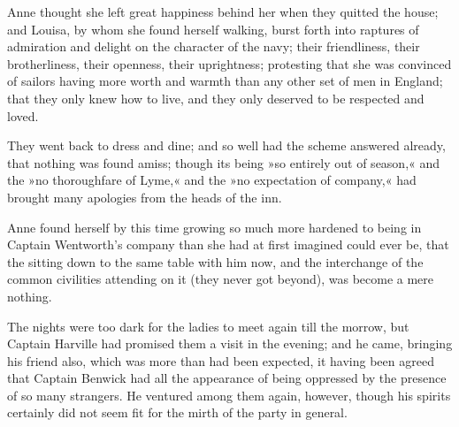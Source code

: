 Anne thought she left great happiness behind her when they quitted the house; and Louisa, by whom she found herself walking, burst forth into raptures of admiration and delight on the character of the navy; their friendliness, their brotherliness, their openness, their uprightness; protesting that she was convinced of sailors having more worth and warmth than any other set of men in England; that they only knew how to live, and they only deserved to be respected and loved.

They went back to dress and dine; and so well had the scheme answered already, that nothing was found amiss; though its being »so entirely out of season,« and the »no thoroughfare of Lyme,« and the »no expectation of company,« had brought many apologies from the heads of the inn.

Anne found herself by this time growing so much more hardened to being in Captain Wentworth's company than she had at first imagined could ever be, that the sitting down to the same table with him now, and the interchange of the common civilities attending on it (they never got beyond), was become a mere nothing.

The nights were too dark for the ladies to meet again till the morrow, but Captain Harville had promised them a visit in the evening; and he came, bringing his friend also, which was more than had been expected, it having been agreed that Captain Benwick had all the appearance of being oppressed by the presence of so many strangers. He ventured among them again, however, though his spirits certainly did not seem fit for the mirth of the party in general.

